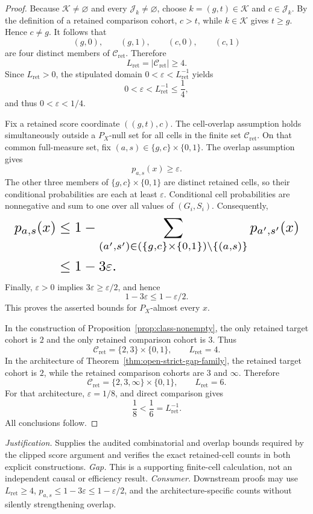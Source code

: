 \documentclass{article}
\begin{document}
\begin{proof}
Because \(\mathcal K\ne\varnothing\) and every \(\mathcal J_k\ne\varnothing\), choose \(k=(g,t)\in\mathcal K\) and \(c\in\mathcal J_k\). By the definition of a retained comparison cohort, \(c>t\), while \(k\in\mathcal K\) gives \(t\ge g\). Hence \(c\ne g\). It follows that
\[
 (g,0),\qquad (g,1),\qquad (c,0),\qquad (c,1)
\]
are four distinct members of \(\mathcal C_{\mathrm{ret}}\). Therefore
\[
 L_{\mathrm{ret}}=|\mathcal C_{\mathrm{ret}}|\ge4.
\]
Since \(L_{\mathrm{ret}}>0\), the stipulated domain \(0<\varepsilon<L_{\mathrm{ret}}^{-1}\) yields
\[
 0<\varepsilon<L_{\mathrm{ret}}^{-1}\le\frac14,
\]
and thus \(0<\varepsilon<1/4\).

Fix a retained score coordinate \(((g,t),c)\). The cell-overlap assumption holds simultaneously outside a \(P_X\)-null set for all cells in the finite set \(\mathcal C_{\mathrm{ret}}\). On that common full-measure set, fix \((a,s)\in\{g,c\}\times\{0,1\}\). The overlap assumption gives
\[
 p_{a,s}(x)\ge\varepsilon.
\]
The other three members of \(\{g,c\}\times\{0,1\}\) are distinct retained cells, so their conditional probabilities are each at least \(\varepsilon\). Conditional cell probabilities are nonnegative and sum to one over all values of \((G_i,S_i)\). Consequently,
\[
\makebox[\linewidth][c]{\resizebox{0.98\linewidth}{!}{\(\displaystyle \begin{aligned}
 p_{a,s}(x)
 &\le 1-
 \sum_{(a^{\prime},s^{\prime})\in(\{g,c\}\times\{0,1\})\setminus\{(a,s)\}}
 p_{a^{\prime},s^{\prime}}(x)\\
 &\le1-3\varepsilon.
\end{aligned}\)}}
\]
Finally, \(\varepsilon>0\) implies \(3\varepsilon\ge\varepsilon/2\), and hence
\[
 1-3\varepsilon\le1-\varepsilon/2.
\]
This proves the asserted bounds for \(P_X\)-almost every \(x\).

In the construction of Proposition~\ref{prop:class-nonempty}, the only retained target cohort is \(2\) and the only retained comparison cohort is \(3\). Thus
\[
 \mathcal C_{\mathrm{ret}}=\{2,3\}\times\{0,1\},
 \qquad L_{\mathrm{ret}}=4.
\]
In the architecture of Theorem~\ref{thm:open-strict-gap-family}, the retained target cohort is \(2\), while the retained comparison cohorts are \(3\) and \(\infty\). Therefore
\[
 \mathcal C_{\mathrm{ret}}=\{2,3,\infty\}\times\{0,1\},
 \qquad L_{\mathrm{ret}}=6.
\]
For that architecture, \(\varepsilon=1/8\), and direct comparison gives
\[
 \frac18<\frac16=L_{\mathrm{ret}}^{-1}.
\]
All conclusions follow.
\end{proof}
\par\smallskip\noindent \textit{Justification.} Supplies the audited combinatorial and overlap bounds required by the clipped score argument and verifies the exact retained-cell counts in both explicit constructions. \textit{Gap.} This is a supporting finite-cell calculation, not an independent causal or efficiency result. \textit{Consumer.} Downstream proofs may use \(L_{\mathrm{ret}}\ge4\), \(p_{a,s}\le1-3\varepsilon\le1-\varepsilon/2\), and the architecture-specific counts without silently strengthening overlap.
\end{document}

